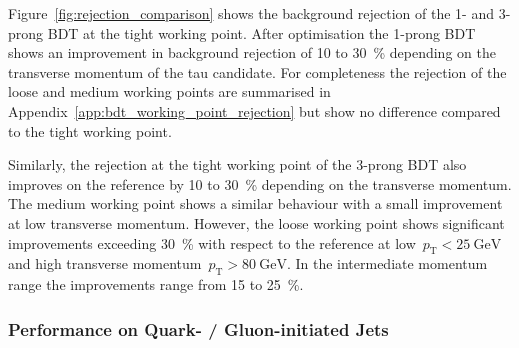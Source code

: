Figure~\ref{fig:rejection_comparison} shows the background rejection of the 1-
and 3-prong BDT at the tight working point. After optimisation the 1-prong BDT
shows an improvement in background rejection of \num{10} to \SI{30}{\percent}
depending on the transverse momentum of the tau candidate. For completeness the
rejection of the loose and medium working points are summarised in
Appendix~\ref{app:bdt_working_point_rejection} but show no difference compared
to the tight working point.

Similarly, the rejection at the tight working point of the 3-prong BDT also
improves on the reference by \num{10} to \SI{30}{\percent} depending on the
transverse momentum. The medium working point shows a similar behaviour with a
small improvement at low transverse momentum. However, the loose working point
shows significant improvements exceeding \SI{30}{\percent} with respect to the
reference at low~$p_\text{T} < \SI{25}{\GeV}$ and high transverse
momentum~$p_\text{T} > \SI{80}{\GeV}$. In the intermediate momentum range the
improvements range from \num{15} to \SI{25}{\percent}.



\subsubsection{Performance on Quark- / Gluon-initiated Jets}
\label{sec:bdt_perf_quark_gluon}


